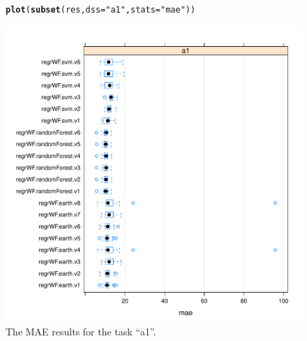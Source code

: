 \documentclass[10pt,a4paper]{article}\usepackage[]{graphicx}\usepackage[]{color}
\makeatletter
\def\maxwidth{ %
  \ifdim\Gin@nat@width>\linewidth
    \linewidth
  \else
    \Gin@nat@width
  \fi
}
\newcommand{\hlstr}[1]{\textcolor[rgb]{0.192,0.494,0.8}{#1}}%
\newcommand{\hlstd}[1]{\textcolor[rgb]{0.345,0.345,0.345}{#1}}%
\newcommand{\hlkwc}[1]{\textcolor[rgb]{0.333,0.667,0.333}{#1}}%
\newcommand{\hlkwd}[1]{\textcolor[rgb]{0.737,0.353,0.396}{\textbf{#1}}}%
\newenvironment{kframe}{%
 \def\at@end@of@kframe{}%
 \ifinner\ifhmode%
  \def\at@end@of@kframe{\end{minipage}}%
  \begin{minipage}{\columnwidth}%
 \fi\fi%
 \def\FrameCommand##1{\hskip\@totalleftmargin \hskip-\fboxsep
 \colorbox{shadecolor}{##1}\hskip-\fboxsep
     \hskip-\linewidth \hskip-\@totalleftmargin \hskip\columnwidth}%
 \MakeFramed {\advance\hsize-\width
   \@totalleftmargin\z@ \linewidth\hsize
   \@setminipage}}%
 {\par\unskip\endMakeFramed%
 \at@end@of@kframe}
\newenvironment{knitrout}{}{} %
\makeatother
\begin{document}
\begin{figure}[ht]
  \centering
\begin{knitrout}
\color{fgcolor}\begin{kframe}
\begin{alltt}
\hlkwd{plot}\hlstd{(}\hlkwd{subset}\hlstd{(res,} \hlkwc{dss} \hlstd{=} \hlstr{"a1"}\hlstd{,} \hlkwc{stats} \hlstd{=} \hlstr{"mae"}\hlstd{))}
\end{alltt}
\end{kframe}

{\centering \includegraphics[width=\maxwidth]{figures/perfEst-unnamed-chunk-21} 

}



\end{knitrout}

  \caption{The MAE results for the task ``a1''.}
  \label{fig:maeA1}
\end{figure}
\end{document}
